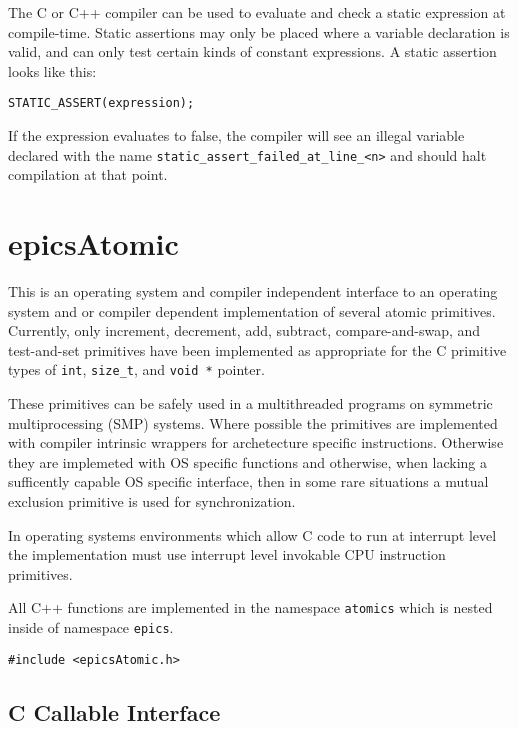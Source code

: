 The C or C++ compiler can be used to evaluate and check a static expression at compile-time.
Static assertions may only be placed where a variable declaration is valid, and can only test certain kinds of constant expressions.
A static assertion looks like this:

\begin{verbatim}
STATIC_ASSERT(expression);
\end{verbatim}

If the expression evaluates to false, the compiler will see an illegal variable declared with the name \verb|static_assert_failed_at_line_<n>| and should halt compilation at that point.

\section{epicsAtomic}

This is an operating system and compiler independent interface to an operating system and or compiler dependent implementation of several atomic primitives.
Currently, only increment, decrement, add, subtract, compare-and-swap, and test-and-set primitives have been implemented as appropriate for the C primitive types of \verb|int|, \verb|size_t|, and \verb|void *| pointer.

These primitives can be safely used in a multithreaded programs on symmetric multiprocessing (SMP) systems.
Where possible the primitives are implemented with compiler intrinsic wrappers for archetecture specific instructions.
Otherwise they are implemeted with OS specific functions and otherwise, when lacking a sufficently capable OS specific interface, then in some rare situations a mutual exclusion primitive is used for synchronization.

In operating systems environments which allow C code to run at interrupt level the implementation must use interrupt level invokable CPU instruction primitives.

All C++ functions are implemented in the namespace \verb|atomics| which is nested inside of namespace \verb|epics|.

\begin{verbatim}
#include <epicsAtomic.h>
\end{verbatim}

\subsection{C Callable Interface}

